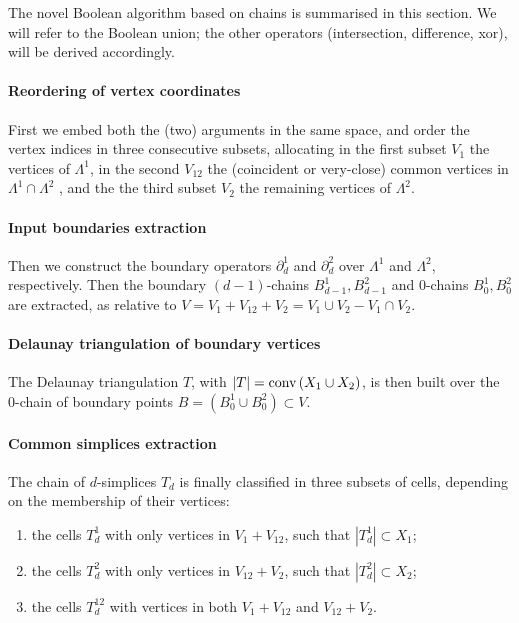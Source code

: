 \documentclass[11pt,oneside]{article}	%
\def\conv{\mbox{\textrm{conv}\,}}
\def\conv{\mbox{\rm conv}\,}
\begin{document}
The novel Boolean algorithm based on chains is summarised in this section. We will refer to the Boolean union; the other operators (intersection, difference, xor), will be derived accordingly.

\paragraph{Reordering of vertex coordinates}
First we embed both the (two) arguments in the same space, and order the vertex indices in three consecutive subsets, allocating in the first subset $V_1$ the vertices of $\Lambda^1$, in the second $V_{12}$ the (coincident or very-close) common vertices in $\Lambda^1\cap\Lambda^2$ , and the the third subset $V_2$ the remaining vertices of $\Lambda^2$. 

\paragraph{Input boundaries extraction}
Then we construct the boundary operators $\partial_d^1$ and $\partial_d^2$ over $\Lambda^1$ and $\Lambda^2$, respectively.
Then the boundary $(d-1)$-chains $B_{d-1}^1,B_{d-1}^2$ and $0$-chains $B_{0}^1,B_{0}^2$ are extracted, as relative to $V = V_{1} + V_{12} + V_{2} = V_{1} \cup V_{2} - V_{1} \cap V_{2}$.

\paragraph{Delaunay triangulation of boundary vertices}
The Delaunay triangulation $T$, with $|T| = \conv (X_1 \cup X_2)$, is then built over the 0-chain of boundary points $B = (B_{0}^1 \cup B_{0}^2) \subset V$.

\paragraph{Common simplices extraction}
The chain of $d$-simplices $T_d$ is finally classified in three subsets of cells, depending on the membership of their vertices:
\begin{enumerate}
\item the cells $T_d^1$ with only vertices in $V_{1} + V_{12}$, such that $|T_d^1|\subset X_1$;
\item the cells $T_d^2$ with only vertices in $V_{12} + V_{2}$, such that $|T_d^2|\subset X_2$;
\item the cells $T_d^{12}$ with vertices in both $V_{1}+V_{12}$ and $V_{12}+V_{2}$.
\end{enumerate}
\end{document}
